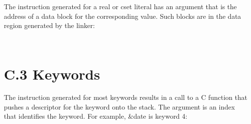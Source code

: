 \begin{flushleft}
\tablelasttail{\hline}
\begin{supertabular}{|m{1.9066598in}|m{2.75596in}|}

\end{supertabular}
\end{flushleft}

The instruction generated for a real or cset literal has an argument
that is the address of a data block for the corresponding value. Such
blocks are in the data region generated by the linker:

\begin{flushleft}
\tablelasttail{\hline}
\begin{supertabular}{|m{1.9066598in}|m{2.75596in}|}

\end{supertabular}
\end{flushleft}

\bigskip

\begin{flushleft}
\tablelasttail{\hline}
\begin{supertabular}{|m{1.9066598in}|m{2.75596in}|}

\end{supertabular}
\end{flushleft}
\section{C.3 Keywords}

The instruction generated for most keywords results in a call to a C
function that pushes a descriptor for the keyword onto the stack. The
argument is an index that identifies the keyword. For example, \&date
is keyword 4:

\begin{flushleft}
\tablelasttail{\hline}
\begin{supertabular}{|m{1.9066598in}|m{2.75596in}|}

\end{supertabular}
\end{flushleft}

